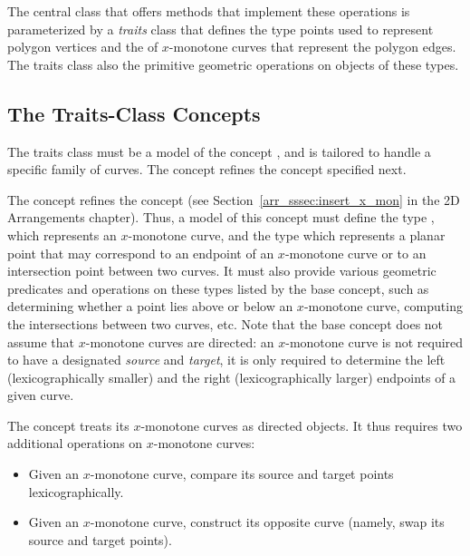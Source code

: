 The central class  that offers
methods that implement these operations is parameterized by a {\em traits}
class that defines the type points used to represent polygon vertices and
the of $x$-monotone curves that represent the polygon edges. The traits
class also the primitive geometric operations on objects of these types.

\subsection{The Traits-Class Concepts}
\label{bops_ssec:traits_concepts}

The traits class must be a model of the concept
, and is tailored to handle a specific 
family of curves. The concept  refines the 
concept  specified next.

The concept  refines the 
concept  (see 
Section~\ref{arr_sssec:insert_x_mon} in the 2D Arrangements chapter).
Thus, a model of this concept must define the type , 
which represents an $x$-monotone curve, and the type  
which represents a planar point that may correspond to an endpoint of an
$x$-monotone curve or to an intersection point between two curves.
It must also provide various geometric predicates and operations 
on these types listed by the base concept, such as determining whether
a point lies above or below an $x$-monotone curve, computing the intersections
between two curves, etc. Note that the base concept does not assume that 
$x$-monotone curves are directed: an $x$-monotone curve is not required
to have a designated {\em source} and {\em target}, it is only required to
determine the left (lexicographically smaller) and the right
(lexicographically larger) endpoints of a given curve.

The  concept treats its
$x$-monotone curves as directed objects. It thus requires two additional
operations on $x$-monotone curves:
\begin{itemize}
\item Given an $x$-monotone curve, compare its source and target points
lexicographically.
\item Given an $x$-monotone curve, construct its opposite curve (namely,
swap its source and target points).
\end{itemize}

